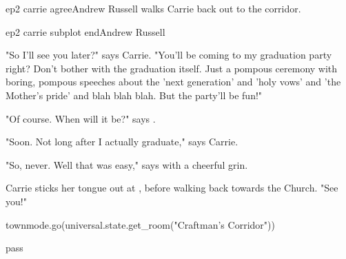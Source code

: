 \documentclass{book}
\begin{document}
\begin{childnode}{ep2 carrie agree}{Andrew Russell}
     \name{} walks Carrie back out to the corridor.






\end{childnode}

\begin{childnode}{ep2 carrie subplot end}{Andrew Russell}


    "So I'll see you later?" says Carrie. "You'll be coming to my graduation party right? Don't bother with the graduation itself. Just a pompous ceremony with boring, pompous speeches about the
    'next generation' and 'holy vows' and 'the Mother's pride' and blah blah blah. But the party'll be fun!"

    "Of course. When will it be?" says \name{}.

    "Soon. Not long after I actually graduate," says Carrie.

    "So, never. Well that was easy," says \name{} with a cheerful grin.

    Carrie sticks her tongue out at \name{}, before walking back towards the Church. "See you!"


    \begin{code}

        townmode.go(universal.state.get\_room("Craftman's Corridor"))

    \end{code}
        
\end{childnode}

\begin{closeScene}
        pass
\end{closeScene}
\end{document}
